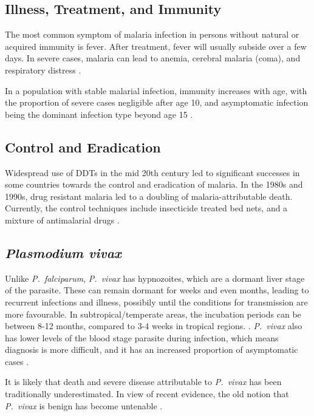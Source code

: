 \subsection*{Illness, Treatment, and Immunity}

The most common symptom of malaria infection in persons without natural or
acquired immunity is fever. After treatment, fever will usually subside over a
few days. In severe cases, malaria can lead to anemia, cerebral malaria (coma),
and respiratory distress \parencite{cowman_malaria_2016}.

In a population with stable malarial infection, immunity increases with age,
with the proportion of severe cases negligible after age 10, and asymptomatic
infection being the dominant infection type beyond age 15
\parencite{cowman_malaria_2016}.

\subsection*{Control and Eradication}

Widespread use of DDTs in the mid 20th century led to significant successes in
some countries towards the control and eradication of malaria. In the 1980s and
1990s, drug resistant malaria led to a doubling of malaria-attributable death.
Currently, the control techniques include insecticide treated bed nets, and a
mixture of antimalarial drugs \parencite{cowman_malaria_2016}.

\subsection*{\textit{Plasmodium vivax}}

Unlike \textit{P.\ falciparum}, \textit{P.\ vivax} has hypnozoites, which are a
dormant liver stage of the parasite. These can remain dormant for weeks and
even months, leading to recurrent infections and illness, possibily until the
conditions for transmission are more favourable. In subtropical/temperate
areas, the incubation periods can be between 8-12 months, compared to 3-4 weeks
in tropical regions. \cite{price_plasmodium_2020}. \textit{P.\ vivax} also has
lower levels of the blood stage parasite during infection, which means
diagnosis is more difficult, and it has an increased proportion of asymptomatic
cases \parencite{adams_biology_2017}.

It is likely that death and severe disease attributable to \textit{P.\ vivax}
has been traditionally underestimated. In view of recent evidence, the old
notion that \textit{P.\ vivax} is benign has become untenable
\parencite{cowman_malaria_2016}.

